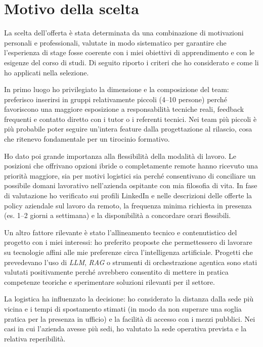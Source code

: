 \section{Motivo della scelta}

La scelta dell’offerta è stata determinata da una combinazione di motivazioni personali e professionali, valutate in modo sistematico per garantire che l’esperienza di stage fosse 
coerente con i miei obiettivi di apprendimento e con le esigenze del corso di studi. Di seguito riporto i criteri che ho considerato e come li ho applicati nella selezione.

In primo luogo ho privilegiato la dimensione e la composizione del team: preferisco inserirsi in gruppi relativamente piccoli (4–10 persone) perché favoriscono una maggiore 
esposizione a responsabilità tecniche reali, feedback frequenti e contatto diretto con i tutor o i referenti tecnici. Nei team più piccoli è più probabile poter seguire 
un’intera feature dalla progettazione al rilascio, cosa che ritenevo fondamentale per un tirocinio formativo.

Ho dato poi grande importanza alla flessibilità della modalità di lavoro. Le posizioni che offrivano opzioni ibride o completamente remote hanno ricevuto una priorità maggiore, 
sia per motivi logistici sia perché consentivano di conciliare un possibile domani lavorativo nell'azienda ospitante con mia filosofia di vita. 
In fase di valutazione ho verificato sui profili LinkedIn e nelle descrizioni delle 
offerte la policy aziendale sul lavoro da remoto, la frequenza minima richiesta in presenza (es. 1–2 giorni a settimana) e la disponibilità a concordare orari flessibili.

Un altro fattore rilevante è stato l’allineamento tecnico e contenutistico del progetto con i miei interessi: ho preferito proposte che permettessero di lavorare su tecnologie 
affini alle mie preferenze circa l'intelligenza artificiale. 
Progetti che prevedevano l’uso di \emph{LLM}, \emph{RAG} o strumenti di orchestrazione agentica sono stati valutati positivamente perché avrebbero consentito di mettere in pratica competenze 
teoriche e sperimentare soluzioni rilevanti per il settore.

La logistica ha influenzato la decisione: ho considerato la distanza dalla sede più vicina e i tempi di spostamento stimati 
(in modo da non superare una soglia pratica per la presenza in ufficio) e la facilità di accesso con i mezzi pubblici. 
Nei casi in cui l’azienda avesse più sedi, ho valutato la sede operativa prevista e la relativa reperibilità.

